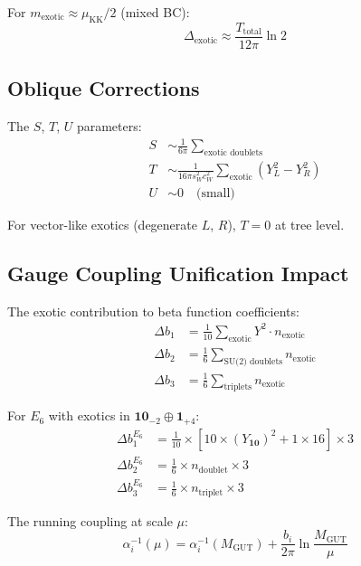 \documentclass[11pt,a4paper]{article}
\begin{document}
For $m_{\text{exotic}} \approx \mu_{\text{KK}}/2$ (mixed BC):
\begin{equation}
\label{eq:threshold-mixed}
\Delta_{\text{exotic}} \approx \frac{T_{\text{total}}}{12\pi} \ln 2
\end{equation}

\subsection{Oblique Corrections}

The $S$, $T$, $U$ parameters:
\begin{align}
\label{eq:S-param}
S &\sim \frac{1}{6\pi} \sum_{\text{exotic doublets}} \\
\label{eq:T-param}
T &\sim \frac{1}{16\pi s_W^2 c_W^2} \sum_{\text{exotic}} (Y_L^2 - Y_R^2) \\
\label{eq:U-param}
U &\sim 0 \quad \text{(small)}
\end{align}

For vector-like exotics (degenerate $L$, $R$), $T = 0$ at tree level.

\subsection{Gauge Coupling Unification Impact}

The exotic contribution to beta function coefficients:
\begin{align}
\label{eq:b1-exotic}
\Delta b_1 &= \frac{1}{10} \sum_{\text{exotic}} Y^2 \cdot n_{\text{exotic}} \\
\label{eq:b2-exotic}
\Delta b_2 &= \frac{1}{6} \sum_{\text{SU(2) doublets}} n_{\text{exotic}} \\
\label{eq:b3-exotic}
\Delta b_3 &= \frac{1}{6} \sum_{\text{triplets}} n_{\text{exotic}}
\end{align}

For $E_6$ with exotics in $\mathbf{10}_{-2} \oplus \mathbf{1}_{+4}$:
\begin{align}
\label{eq:e6-b1}
\Delta b_1^{E_6} &= \frac{1}{10} \times [10 \times (Y_{\mathbf{10}})^2 + 1 \times 16] \times 3 \\
\label{eq:e6-b2}
\Delta b_2^{E_6} &= \frac{1}{6} \times n_{\text{doublet}} \times 3 \\
\label{eq:e6-b3}
\Delta b_3^{E_6} &= \frac{1}{6} \times n_{\text{triplet}} \times 3
\end{align}

The running coupling at scale $\mu$:
\begin{equation}
\label{eq:running-coupling}
\alpha_i^{-1}(\mu) = \alpha_i^{-1}(M_{\text{GUT}}) + \frac{b_i}{2\pi} \ln\frac{M_{\text{GUT}}}{\mu}
\end{equation}
\end{document}
